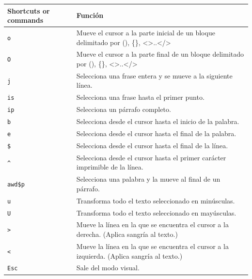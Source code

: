 \documentclass[
  doc,
  floatsintext,
  longtable,
  a4paper,
  nolmodern,
  notxfonts,
  notimes,
  12pt,
  colorlinks=true,linkcolor=blue,citecolor=blue,urlcolor=blue]{apa7}
\newcounter{none} %
\begin{document}
{\def\LTcaptype{none} %
\begin{longtable}[]{@{}
  >{\raggedright\arraybackslash}p{}
  >{\raggedright\arraybackslash}p{}@{}}
\toprule\noalign{}
\begin{minipage}[b]{\linewidth}\raggedright
Shortcuts or commands
\end{minipage} & \begin{minipage}[b]{\linewidth}\raggedright
Función
\end{minipage} \\
\midrule\noalign{}
\endhead
\bottomrule\noalign{}
\endlastfoot
\texttt{o} & Mueve el cursor a la parte inicial de un bloque delimitado
por (), \{\}, \textless\textgreater..\textless/\textgreater{} \\
\texttt{O} & Mueve el cursor a la parte final de un bloque delimitado
por (), \{\}, \textless\textgreater..\textless/\textgreater{} \\
\texttt{j} & Selecciona una frase entera y se mueve a la siguiente
línea. \\
\texttt{is} & Selecciona una frase hasta el primer punto. \\
\texttt{ip} & Selecciona un párrafo completo. \\
\texttt{b} & Selecciona desde el cursor hasta el inicio de la
palabra. \\
\texttt{e} & Selecciona desde el cursor hasta el final de la palabra. \\
\texttt{\$} & Selecciona desde el cursor hasta el final de la línea. \\
\texttt{\^{}} & Selecciona desde el cursor hasta el primer carácter
imprimible de la línea. \\
\texttt{awd\$p} & Selecciona una palabra y la mueve al final de un
párrafo. \\
\texttt{u} & Transforma todo el texto seleccionado en minúsculas. \\
\texttt{U} & Transforma todo el texto seleccionado en mayúsculas. \\
\texttt{\textgreater{}} & Mueve la línea en la que se encuentra el
cursor a la derecha. (Aplica sangría al texto.) \\
\texttt{\textless{}} & Mueve la línea en la que se encuentra el cursor a
la izquierda. (Aplica sangría al texto.) \\
\texttt{Esc} & Sale del modo visual. \\
\end{longtable}
}
\end{document}
